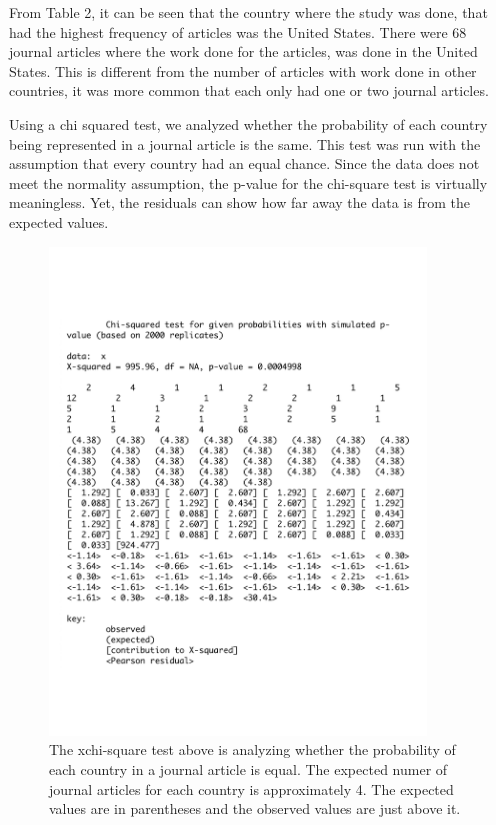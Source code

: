 \documentclass[12pt, letterpaper]{article}
\begin{document}
From Table 2, it can be seen that the country where the study was done, that had the highest frequency of articles was the United States. There were 68 journal articles where the work done for the articles, was done in the United States. This is different from the number of articles with work done in other countries, it was more common that each only had one or two journal articles. 

Using a chi squared test, we analyzed whether the probability of each country being represented in a journal article is the same. This test was run with the assumption that every country had an equal chance. Since the data does not meet the normality assumption, the p-value for the chi-square test is virtually meaningless. Yet, the residuals can show how far away the data is from the expected values.

\begin{figure}[!h]
\begin{center}
\includegraphics[width=10cm]{xchisq_country.pdf}
\caption{The xchi-square test above is analyzing whether the probability of each country in a  journal article is equal. The expected numer of journal articles for each country is approximately 4. The expected values are in parentheses and the observed values are just above it.}
\label{fig: Chi Square for Country}
\end{center}
\end{figure}
\end{document}
